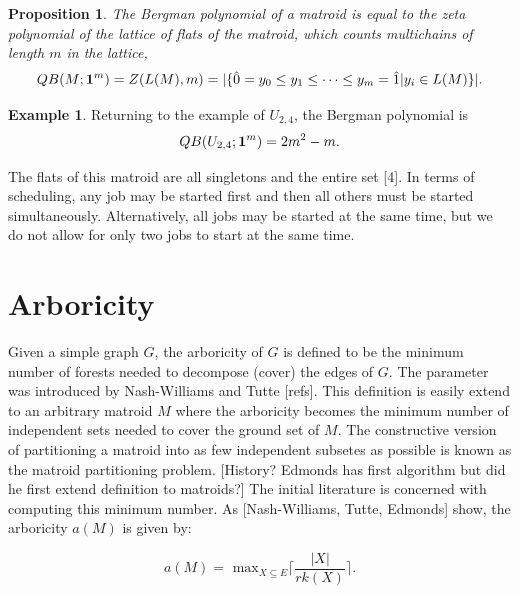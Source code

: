 \documentclass[12pt,reqno]{amsart}
\numberwithin{definition}{section}
\newtheorem{proposition}[definition]{Proposition}
\theoremstyle{definition}
\newtheorem{example}[definition]{Example}
\begin{document}
\begin{proposition}
The Bergman polynomial of a matroid is equal to the zeta polynomial of the lattice of flats of the matroid, which counts multichains of length $m$ in the lattice,
$$QB(M;{\bf 1}^m) = Z(L(M),m) = |\{ \hat{0} = y_0 \leq y_1 \leq \cdots \leq y_m = \hat{1} | y_i \in L(M) \}|.$$

\end{proposition}



\begin{example}
Returning to the example of $U_{2,4}$, the Bergman polynomial is
$$QB(U_{2,4};{\bf 1}^m) = 2m^2 - m.$$

The flats of this matroid are all singletons and the entire set [4].  In terms of scheduling, any job may be started first and then all others must be started simultaneously.  Alternatively, all jobs may be started at the same time, but we do not allow for only two jobs to start at the same time. 
\end{example}



\section{Arboricity}



Given a simple graph $G$, the arboricity of $G$ is defined to be the
minimum number of forests needed to decompose (cover) the edges of
$G$.  The parameter was introduced by Nash-Williams and Tutte [refs].
This definition is easily extend to an arbitrary matroid $M$ where the
arboricity becomes the minimum number of independent sets needed to
cover the ground set of $M$.  The constructive version of partitioning
a matroid into as few independent subsetes as possible is known as the
matroid partitioning problem. [History?  Edmonds has first algorithm
  but did he first extend definition to matroids?]  The initial
literature is concerned with computing this minimum number.  As
[Nash-Williams, Tutte, Edmonds] show, the arboricity $a(M)$ is given
by:

$$ a(M) = \textrm{ max}_{X\subseteq E} \lceil { \frac{|X|}{rk(X)}} \rceil . $$
\end{document}
